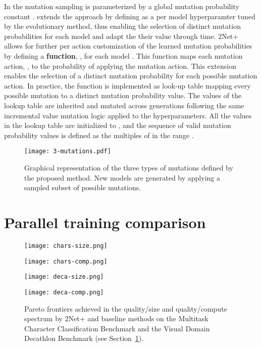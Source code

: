 \documentclass{article} \usepackage{iclr2023_conference,times}
\newcommand{\method}{2Net+\xspace}
\begin{document}
In \citet{Gesmundo2022munet1} the mutation sampling is parameterized by a global mutation probability constant .
\citet{Gesmundo2022munet2} extends the approach by defining  as a per model hyperparamter tuned by the evolutionary method, thus enabling the selection of distinct mutation probabilities for each model and adapt the their value through time.
\method allows for further per action customization of the learned mutation probabilities by defining a  \textbf{function}, , for each model .
This function maps each mutation action, , to the probability of applying the mutation action.
This extension enables the selection of a distinct mutation probability for each possible mutation action.
In practice, the  function is implemented as look-up table mapping every possible mutation to a distinct mutation probability value.
The values of the lookup table are inherited and mutated across generations following the same incremental value mutation logic applied to the hyperparameters.
All the values in the lookup table are initialized to , and the sequence of valid mutation probability values is defined as the multiples of 
in the range .



\begin{figure}
  \centering
\texttt{[image: 3-mutations.pdf]}
  \caption{Graphical representation of the three types of mutations defined by the proposed method.
New models are generated by applying a sampled subset of possible mutations.
}
\label{fig:mut}
\end{figure}

\section{Parallel training comparison}
\label{section:preliminary}

\begin{figure}[t]
\centering
{}\par\medskip
\begin{minipage}{.5\textwidth}
  \centering
  \texttt{[image: chars-size.png]}
\end{minipage}\begin{minipage}{.5\textwidth}
  \centering
  \texttt{[image: chars-comp.png]}
\end{minipage}
\par\medskip
{}\par\medskip
\begin{minipage}{.5\textwidth}
  \centering
  \texttt{[image: deca-size.png]}
\end{minipage}\begin{minipage}{.5\textwidth}
  \centering
  \texttt{[image: deca-comp.png]}
\end{minipage}
\caption{Pareto frontiers achieved in the quality/size and quality/compute spectrum by \method and baseline methods on the Multitask Character Classification Benchmark and the Visual Domain Decathlon Benchmark (see Section~\ref{section:preliminary}).}
\label{fig:curves}
\end{figure}
\end{document}
